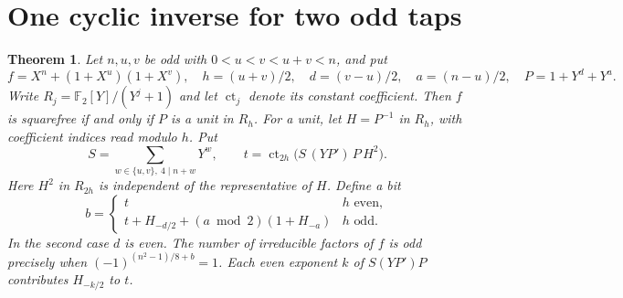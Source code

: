 \documentclass[11pt]{article}
\newtheorem{theorem}{Theorem}
\begin{document}
\section{One cyclic inverse for two odd taps}
\label{sec:odd-tap-parity}
\begin{theorem}\label{thm:odd-tap-parity}
Let \(n,u,v\) be odd with \(0<u<v<u+v<n\), and put
\[
 f=X^n+(1+X^u)(1+X^v),\quad h=(u+v)/2,\quad
 d=(v-u)/2,\quad a=(n-u)/2,\quad P=1+Y^d+Y^a .
\]
Write \(R_j=\mathbb F_2[Y]/(Y^j+1)\) and let \(\operatorname{ct}_j\)
denote its constant coefficient. Then \(f\) is squarefree if and only
if \(P\) is a unit in \(R_h\). For a unit, let \(H=P^{-1}\) in
\(R_h\), with coefficient indices read modulo \(h\). Put
\[
 S=\sum_{w\in\{u,v\},\ 4\mid n+w}Y^w,\qquad
 t=\operatorname{ct}_{2h}\big(S\,(YP')\,P\,H^2\big).
\]
Here \(H^2\) in \(R_{2h}\) is independent of the representative of
\(H\). Define a bit
\[
 b=\begin{cases}
 t & h\text{ even},\\
 t+H_{-d/2}+(a\bmod2)(1+H_{-a}) & h\text{ odd}.
 \end{cases}
\]
In the second case \(d\) is even. The number of irreducible factors
of \(f\) is odd precisely when
\( (-1)^{(n^2-1)/8+b}=1\). Each even exponent \(k\) of \(S(YP')P\) contributes \(H_{-k/2}\) to \(t\).
\end{theorem}
\end{document}
